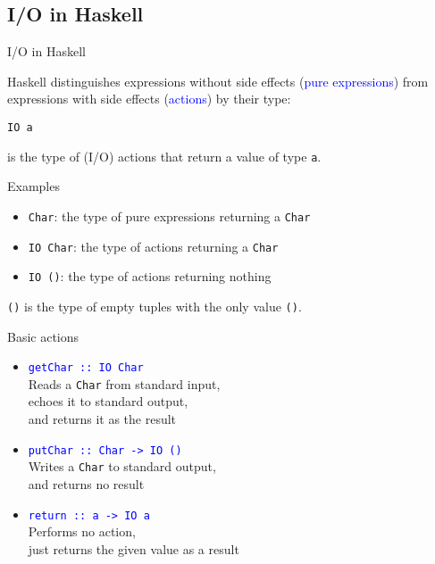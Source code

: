\documentclass{beamer}
\def\code#1{\texttt{\frenchspacing#1}}
\begin{document}
\subsection{I/O in Haskell}

\begin{frame}{I/O in Haskell}

Haskell distinguishes expressions without side effects (\textcolor{blue}{pure expressions}) from expressions with side effects (\textcolor{blue}{actions}) by their type:

\begin{block}{\centering \code{IO a}}
\end{block}

is the type of (I/O) actions that return a value of type \code{a}.

\pause

\begin{exampleblock}{Examples}
\begin{itemize}
    \item \code{Char}: the type of pure expressions returning a \code{Char}\pause
    \item \code{IO Char}: the type of actions returning a \code{Char}\pause
    \item \code{IO ()}: the type of actions returning nothing
\end{itemize}
\end{exampleblock}

\pause

\begin{alertblock}{\centering \code{()} is the type of empty tuples with the only value \code{()}.}
\end{alertblock}

\end{frame}

\begin{frame}{Basic actions}

\begin{itemize}
    \item \textcolor{blue}{\code{getChar :: IO Char}} \\
        Reads a \code{Char} from standard input, \\
        echoes it to standard output, \\
        and returns it as the result\pause
    \item \textcolor{blue}{\code{putChar :: Char -> IO ()}} \\
        Writes a \code{Char} to standard output, \\
        and returns no result\pause
    \item \textcolor{blue}{\code{return :: a -> IO a}} \\
        Performs no action, \\
        just returns the given value as a result
\end{itemize}

\end{frame}
\end{document}
